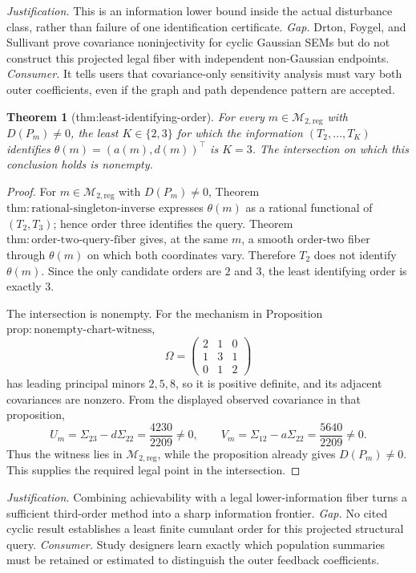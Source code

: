 \documentclass{article}
\newtheorem{theorem}{Theorem}
\begin{document}
\par\smallskip\noindent \textit{Justification.} This is an information lower bound inside the actual disturbance class, rather than failure of one identification certificate. \textit{Gap.} Drton, Foygel, and Sullivant prove covariance noninjectivity for cyclic Gaussian SEMs but do not construct this projected legal fiber with independent non-Gaussian endpoints. \textit{Consumer.} It tells users that covariance-only sensitivity analysis must vary both outer coefficients, even if the graph and path dependence pattern are accepted.

\begin{theorem}[thm:least-identifying-order]\label{thm:least-identifying-order}
For every \(m\in\mathcal M_{2,\mathrm{reg}}\) with \(D(P_m)\neq0\), the least \(K\in\{2,3\}\) for which the information \((T_2,\ldots,T_K)\) identifies \(\theta(m)=(a(m),d(m))^\top\) is \(K=3\). The intersection on which this conclusion holds is nonempty.
\end{theorem}
\begin{proof}
For \(m\in\mathcal M_{2,\mathrm{reg}}\) with \(D(P_m)\neq0\), Theorem \(\mathrm{thm:rational\mbox{-}singleton\mbox{-}inverse}\) expresses \(\theta(m)\) as a rational functional of \((T_2,T_3)\); hence order three identifies the query. Theorem \(\mathrm{thm:order\mbox{-}two\mbox{-}query\mbox{-}fiber}\) gives, at the same \(m\), a smooth order-two fiber through \(\theta(m)\) on which both coordinates vary. Therefore \(T_2\) does not identify \(\theta(m)\). Since the only candidate orders are \(2\) and \(3\), the least identifying order is exactly \(3\).

The intersection is nonempty. For the mechanism in Proposition \(\mathrm{prop:nonempty\mbox{-}chart\mbox{-}witness}\),
\[
\Omega=
\begin{pmatrix}2&1&0\\1&3&1\\0&1&2\end{pmatrix}
\]
has leading principal minors \(2,5,8\), so it is positive definite, and its adjacent covariances are nonzero. From the displayed observed covariance in that proposition,
\[
U_m=\Sigma_{23}-d\Sigma_{22}=\frac{4230}{2209}\neq0,
\qquad
V_m=\Sigma_{12}-a\Sigma_{22}=\frac{5640}{2209}\neq0.
\]
Thus the witness lies in \(\mathcal M_{2,\mathrm{reg}}\), while the proposition already gives \(D(P_m)\neq0\). This supplies the required legal point in the intersection.
\end{proof}
\par\smallskip\noindent \textit{Justification.} Combining achievability with a legal lower-information fiber turns a sufficient third-order method into a sharp information frontier. \textit{Gap.} No cited cyclic result establishes a least finite cumulant order for this projected structural query. \textit{Consumer.} Study designers learn exactly which population summaries must be retained or estimated to distinguish the outer feedback coefficients.
\end{document}
